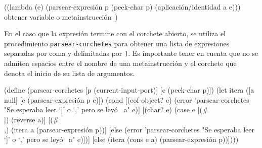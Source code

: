 \documentclass[letterpaper,twoside,openright,11pt]{book}
\begin{document}
\nwenddocs{}\endmoddef
((lambda (e)
   (parsear-expresión p (peek-char p) (aplicación/identidad a e)))
 \LA{}obtener variable o metainstrucción~{\nwtagstyle{}}\RA{})
\nwendcode{}\nwdocspar

En el caso que la expresión termine con el corchete abierto, se utiliza el procedimiento {\tt{}\protect{}\protect{}parsear-corchetes} para obtener una lista de expresiones separadas por coma y delimitadas por {\tt{}{}{}]}. Es importante tener en cuenta que no se admiten espacios entre el nombre de una metainstrucción y el corchete que denota el inicio de su lista de argumentos.

\nwenddocs{}\plusendmoddef
(define (parsear-corchetes [p (current-input-port)]
                           [c (peek-char p)])
  (let itera ([a null]
              [e (parsear-expresión p c)])
       (cond [(eof-object? e)
              (error 'parsear-corchetes
                     "Se esperaba leer `]' o `,' pero se leyó ~a" e)]
             [(char? e)
              (case e
                [(#\\]) (reverse a)]
                [(#\\,) (itera a (parsear-expresión p))]
                [else
                 (error 'parsear-corchetes
                        "Se esperaba leer `]' o `,' pero se leyó ~a" e)])]
             [else
              (itera (cons e a) (parsear-expresión p))])))

\eatline
{}\nwendcode{}\nwdocspar
\end{document}
